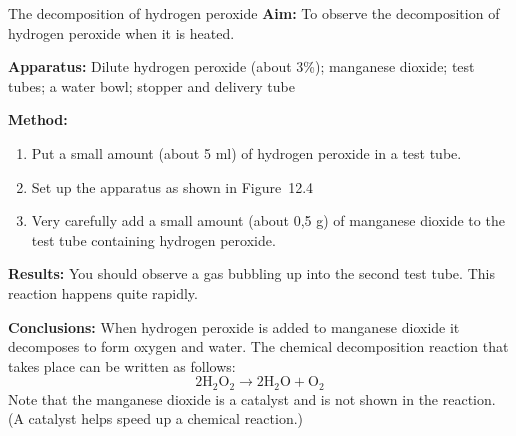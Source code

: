             \begin{g_experiment}{The decomposition of hydrogen peroxide}
            \nopagebreak
            \label{m38709*id63175}\noindent{}\textbf{Aim:}\newline
    To observe the decomposition of hydrogen peroxide when it is heated.\par 
        \label{m38709*id63194}\noindent{}\textbf{Apparatus:}\newline
    Dilute hydrogen peroxide (about 3\%); manganese dioxide; test tubes; a water bowl; stopper and delivery tube\par 
        \label{m38709*eip-470}
	\par
      \label{m38709*id63199}
    \setcounter{subfigure}{0}
	\begin{figure}[H] %
    \begin{center}
    \end{center}
 \end{figure}       
        \par 
        \label{m38709*id63206}\noindent{}\textbf{Method:}\label{m38709*id63212}\begin{enumerate}[noitemsep, label=\textbf{\arabic*}. ] 
            \label{m38709*uid11}\item Put a small amount (about 5 ml) of hydrogen peroxide in a test tube.
\label{m38709*uid12}\item Set up the apparatus as shown in Figure~12.4
\label{m38709*uid13}\item Very carefully add a small amount (about 0,5 g) of manganese dioxide to the test tube containing hydrogen peroxide. 
\end{enumerate}
        \par 
        \label{m38709*id63254}\noindent{}\textbf{Results:}\newline
    You should observe a gas bubbling up into the second test tube. This reaction happens quite rapidly. \par 
        \label{m38709*id63302}\noindent{}\textbf{Conclusions:}\newline
    When hydrogen peroxide is added to manganese dioxide it decomposes to form oxygen and water. The chemical decomposition reaction that takes place can be written as follows:
        \label{m38709*id63313}\nopagebreak\noindent{}
    \begin{equation}
    2{\mathrm{H}}_{2}{\mathrm{O}}_{2}\to 2\mathrm{H}{}_{2}\mathrm{O}+{\mathrm{O}}_{2}\tag{12.3}
      \end{equation}
Note that the manganese dioxide is a catalyst and is not shown in the reaction. (A catalyst helps speed up a chemical reaction.)    \par 
\end{g_experiment}
